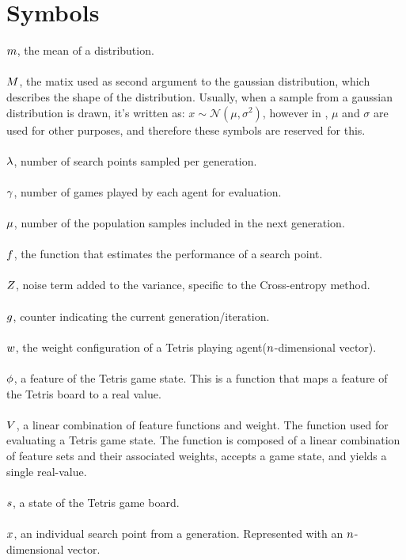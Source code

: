 \clearpage
\section*{Symbols}

$m$, the mean of a distribution.\\
\\
$M$, the matix used as 
second argument to the gaussian distribution, 
which describes the shape of the distribution. 
Usually, when a sample from a gaussian distribution 
is drawn, it's written as: 
$x \sim \mathcal{N} \left( \mu, \sigma^{2} \right)$, 
however in \citep{hansen2011},
$\mu$ and $\sigma$ are used for other 
purposes, and therefore these symbols are reserved for this.\\
\\
$\lambda$, number of search points sampled per generation.\\
\\
$\gamma$, number of games played by each agent for evaluation.\\
\\
$\mu$, number of the population samples included in the next generation.\\
\\
$f$, the function that estimates the performance of a search point.\\
\\
$Z$, noise term added to the variance, specific to the Cross-entropy method.\\
\\
$g$, counter indicating the current generation/iteration.\\
\\
$w$, the weight configuration of a Tetris playing agent($n $-dimensional vector).\\
\\
$\phi$, a feature of the Tetris game state. This is a function that maps a 
feature of the Tetris board to a real value.\\
\\
$V$, a linear combination of feature functions and weight. 
The function used for evaluating a Tetris game state. 
The function is composed of a linear combination of feature sets and their
associated weights, accepts a game state, and yields a single real-value.\\
\\
$s$, a state of the Tetris game board.\\
\\
$x$, an individual search point from a generation. 
Represented with an $n$-dimensional vector.

\clearpage

